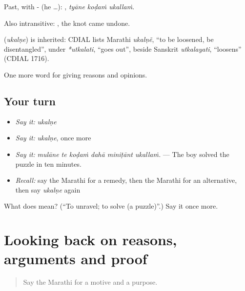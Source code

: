Past, with - (he …):   , \emph{tyāne koḍaṁ ukallaṁ}.

Also intransitive:  , the knot came undone.

\begin{cousinweb}
\textbf{} (\emph{ukalṇe}) is inherited: CDIAL lists Marathi \emph{ukalṇẽ}, \textquotedblleft{}to be loosened, be disentangled\textquotedblright{}, under \emph{*utkalati}, \textquotedblleft{}goes out\textquotedblright{}, beside Sanskrit \emph{utkalayati}, \textquotedblleft{}loosens\textquotedblright{} (CDIAL 1716).
\end{cousinweb}

\begin{grammarlens}[title={What you've built}]
One more word for giving reasons and opinions.
\end{grammarlens}

\subsection*{Your turn}
\begin{itemize}
\raggedright
  \item \emph{Say it:} \emph{ukalṇe}
  \item \emph{Say it:} \emph{ukalṇe}, once more
  \item \emph{Say it:} \emph{mulāne te koḍaṁ dahā miniṭānt ukallaṁ.} — The boy solved the puzzle in ten minutes.
  \item \emph{Recall:} say the Marathi for a remedy, then the Marathi for an alternative, then say \emph{ukalṇe} again
\end{itemize}

\begin{tcolorbox}[breakable,colback=teal!4,colframe=teal!35!black,title={Before you move on}]
What does  mean? (\textquotedblleft{}To unravel; to solve (a puzzle)\textquotedblright{}.) Say it once more.
\end{tcolorbox}
\section[(dialogue)]{Looking back on reasons, arguments and proof}

\label{lesson:MR-R349-review-342-349}



\begin{quote}
Say the Marathi for a motive and a purpose.
\end{quote}

